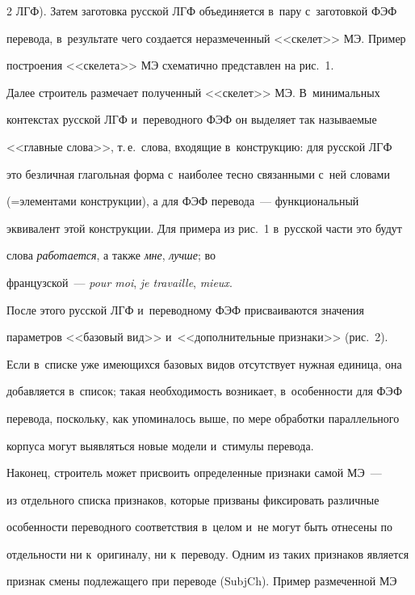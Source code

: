 \begin{multicols}{2}
ЛГФ). Затем заготовка русской ЛГФ объединяется в~пару с~заготовкой ФЭФ 

перевода, в~результате чего создается неразмеченный <<скелет>> МЭ. Пример 

построения <<скелета>> МЭ схематично представлен на рис.~1. 





  Далее строитель размечает полученный <<скелет>> МЭ. В~минимальных 

контекстах русской ЛГФ и~переводного ФЭФ он выделяет так называемые 

<<главные слова>>, т.\,е.\ слова, входящие в~конструкцию: для русской ЛГФ 

это безличная глагольная форма с~наиболее тесно связанными с~ней словами 

(=\;эле\-мен\-та\-ми конструкции), а для ФЭФ перевода~--- функциональный 

эквивалент этой конструкции. Для примера из рис.~1 в~русской части это будут 

слова \textit{работается}, а также \textit{мне}, \textit{лучше}; во  

французской~--- \textit{pour moi}, \textit{je travaille}, \textit{mieux}.

  

  После этого русской ЛГФ и~переводному ФЭФ присваиваются значения 

параметров <<базовый вид>> и~<<дополнительные признаки>> (рис.~2). 

Если в~списке уже имеющихся базовых видов отсутствует нужная единица, она 

добавляется в~список; такая необходимость возникает, в~особенности для ФЭФ 

перевода, поскольку, как упоминалось выше, по мере обработки параллельного 

корпуса могут выявляться новые модели и~стимулы перевода. 

  

  Наконец, строитель может присвоить определенные признаки самой МЭ~--- 

из отдельного списка признаков, которые призваны фиксировать различные 

особенности переводного соответствия в~целом и~не могут быть отнесены по 

отдельности ни к~оригиналу, ни к~переводу. Одним из таких признаков является 

признак смены подлежащего при переводе (SubjCh). Пример размеченной МЭ 


\end{multicols}
